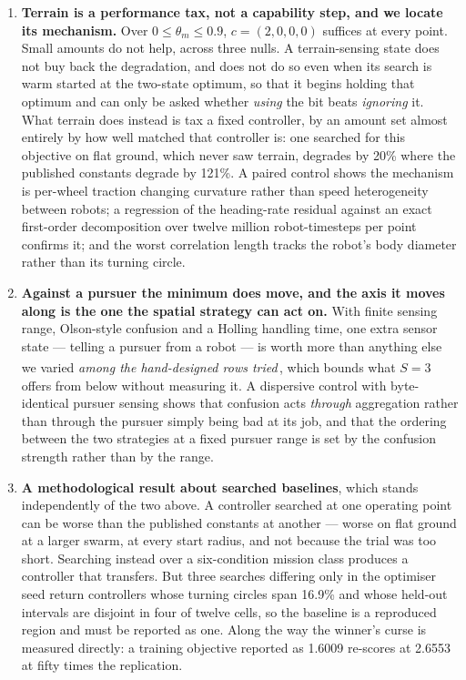 \documentclass[11pt,a4paper]{article}
\newcommand{\ddg}{\textsuperscript{\ddag}}
\begin{document}
\begin{enumerate}
\item \textbf{Terrain is a performance tax, not a capability step, and we
locate its mechanism.} Over $0 \le \theta_m \le 0.9$, $c = (2,0,0,0)$ suffices at
every point. Small amounts do not help, across three nulls. A terrain-sensing
state does not buy back the degradation, and does not do so even when its search
is warm started at the two-state optimum, so that it begins holding that optimum
and can only be asked whether \emph{using} the bit beats \emph{ignoring} it. What
terrain does instead is tax a fixed controller, by an amount set almost entirely
by how well matched that controller is: one searched for this objective on flat
ground, which never saw terrain, degrades by 20\% where the published constants
degrade by 121\%. A paired control shows the mechanism is per-wheel traction
changing curvature rather than speed heterogeneity between robots; a regression
of the heading-rate residual against an exact first-order decomposition over
twelve million robot-timesteps per point confirms it; and the worst correlation
length tracks the robot's body diameter rather than its turning circle.

\item \textbf{Against a pursuer the minimum does move, and the axis it moves
along is the one the spatial strategy can act on.} With finite sensing range,
Olson-style confusion and a Holling handling time, one extra sensor state ---
telling a pursuer from a robot --- is worth more than anything else we varied
\emph{among the hand-designed rows tried}\,\ddg, which bounds what $S = 3$ offers
from below without measuring it. A dispersive control with byte-identical pursuer
sensing shows that confusion acts
\emph{through} aggregation rather than through the pursuer simply being bad at
its job, and that the ordering between the two strategies at a fixed pursuer
range is set by the confusion strength rather than by the range.

\item \textbf{A methodological result about searched baselines}, which stands
independently of the two above. A controller searched at one operating point can
be worse than the published constants at another --- worse on flat ground at a
larger swarm, at every start radius, and not because the trial was too short.
Searching instead over a six-condition mission class produces a controller that
transfers. But three searches differing only in the optimiser seed return
controllers whose turning circles span 16.9\% and whose held-out intervals are
disjoint in four of twelve cells, so the baseline is a reproduced region and must
be reported as one. Along the way the winner's curse is measured directly: a
training objective reported as 1.6009 re-scores at 2.6553 at fifty times the
replication.
\end{enumerate}
\end{document}
